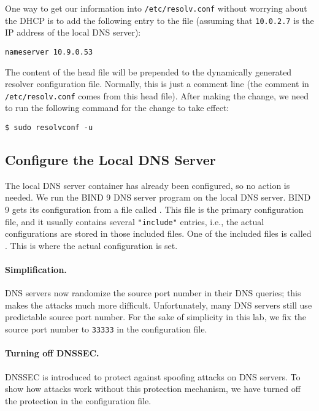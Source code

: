 One way to get our information into \texttt{/etc/resolv.conf} without worrying about
the DHCP is to add the following entry to the 
file (assuming that \texttt{10.0.2.7} is the IP address of the local DNS server):

\begin{lstlisting}
nameserver 10.9.0.53
\end{lstlisting}


The content of the head file will be prepended to the dynamically generated resolver
configuration file. Normally, this is just a comment line (the comment in
\texttt{/etc/resolv.conf} comes from this head file). After making the change,
we need to run the following command for the change to take effect:

\begin{lstlisting}
$ sudo resolvconf -u
\end{lstlisting}


\subsection{Configure the Local DNS Server} 

The local DNS server container has already been configured, 
so no action is needed. 
We run the BIND 9 DNS server program on the local DNS server. 
BIND 9 gets its configuration from a file called . This file
is the primary configuration file, and it usually contains several \texttt{"include"}
entries, i.e., the actual configurations are stored in those included files. One of the
included files is called . 
This is where the actual configuration is set. 

\paragraph{Simplification.}
DNS servers now randomize
the source port number in their DNS queries; this makes the attacks much more
difficult. Unfortunately, many DNS servers still use predictable source
port number.  For the sake of simplicity in this lab, we fix the
source port number to  {\tt 33333} in the 
configuration file. 

\paragraph{Turning off DNSSEC.} 
DNSSEC is introduced to protect against spoofing attacks on DNS servers.
To show how attacks work
without this protection mechanism, we have turned off the protection 
in the configuration file. 



